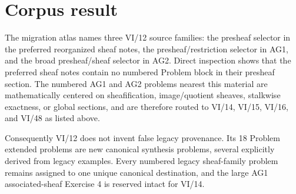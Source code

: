 \section*{Corpus result}

The migration atlas names three VI/12 source families: the presheaf selector in the
preferred reorganized sheaf notes, the presheaf/restriction selector in AG1, and the broad
presheaf/sheaf selector in AG2.  Direct inspection shows that the preferred sheaf notes
contain no numbered Problem block in their presheaf section.  The numbered AG1 and AG2
problems nearest this material are mathematically centered on sheafification, image/quotient
sheaves, stalkwise exactness, or global sections, and are therefore routed to VI/14, VI/15,
VI/16, and VI/48 as listed above.

Consequently VI/12 does not invent false legacy provenance.  Its 18 Problem extended problems are new
canonical synthesis problems, several explicitly derived from legacy examples.  Every
numbered legacy sheaf-family problem remains assigned to one unique canonical destination,
and the large AG1 associated-sheaf Exercise 4 is reserved intact for VI/14.
